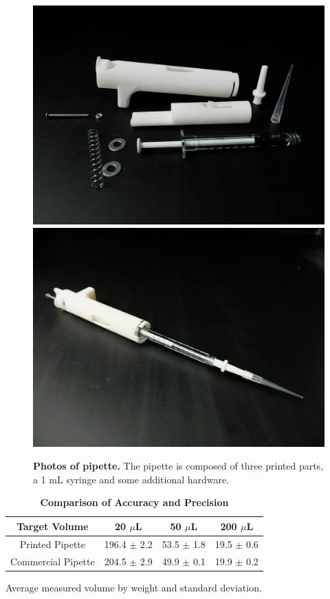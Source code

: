 \documentclass[]{article}
\begin{document}
\begin{figure}
\includegraphics[scale=0.04]{pipette-disassembled.JPG} %
\includegraphics[scale=0.04]{pipette-assembled.JPG} %
\caption{
{\bf Photos of pipette.}  The pipette is composed of three printed parts, a 1 mL syringe and some additional hardware.  
}
\label{figure2}
\end{figure}

\begin{table}[!ht]
\caption{
\bf{Comparison of Accuracy and Precision}}
\begin{tabular}{|c|c|c|c|}
\hline
    Target Volume & 20 $\mu$L & 50 $\mu$L & 200 $\mu$L  \\
    \hline
    Printed Pipette & 196.4 $\pm$ 2.2 & 53.5 $\pm$ 1.8 & 19.5 $\pm$ 0.6 \\
    Commercial Pipette & 204.5 $\pm$ 2.9 & 49.9 $\pm$ 0.1 & 19.9 $\pm$ 0.2 \\
    \hline
\end{tabular}
\begin{flushleft} Average measured volume by weight and standard deviation.
\end{flushleft}
\label{tab:comp}
 \end{table}
\end{document}
